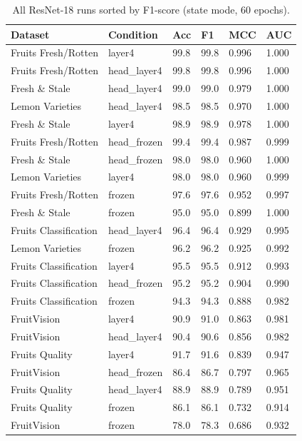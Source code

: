 \documentclass[12pt, a4paper]{article}
\begin{document}
\begin{table}[h]
\centering
\small
\caption{All ResNet-18 runs sorted by F1-score (state mode, 60 epochs).}
\label{tab:allruns}
\setlength{\tabcolsep}{4pt}
\begin{tabular}{L{3.5cm} C{2.2cm} C{1.2cm} C{1.2cm} C{1.2cm} C{1.2cm}}
\toprule
\textbf{Dataset} & \textbf{Condition} & \textbf{Acc} & \textbf{F1} & \textbf{MCC} & \textbf{AUC} \\
\midrule
Fruits Fresh/Rotten & layer4      & 99.8 & 99.8 & 0.996 & 1.000 \\
Fruits Fresh/Rotten & head\_layer4 & 99.8 & 99.8 & 0.996 & 1.000 \\
Fresh \& Stale      & head\_layer4 & 99.0 & 99.0 & 0.979 & 1.000 \\
Lemon Varieties     & head\_layer4 & 98.5 & 98.5 & 0.970 & 1.000 \\
Fresh \& Stale      & layer4      & 98.9 & 98.9 & 0.978 & 1.000 \\
Fruits Fresh/Rotten & head\_frozen & 99.4 & 99.4 & 0.987 & 0.999 \\
Fresh \& Stale      & head\_frozen & 98.0 & 98.0 & 0.960 & 1.000 \\
Lemon Varieties     & layer4      & 98.0 & 98.0 & 0.960 & 0.999 \\
Fruits Fresh/Rotten & frozen      & 97.6 & 97.6 & 0.952 & 0.997 \\
Fresh \& Stale      & frozen      & 95.0 & 95.0 & 0.899 & 1.000 \\
Fruits Classification & head\_layer4 & 96.4 & 96.4 & 0.929 & 0.995 \\
Lemon Varieties     & frozen      & 96.2 & 96.2 & 0.925 & 0.992 \\
Fruits Classification & layer4    & 95.5 & 95.5 & 0.912 & 0.993 \\
Fruits Classification & head\_frozen & 95.2 & 95.2 & 0.904 & 0.990 \\
Fruits Classification & frozen    & 94.3 & 94.3 & 0.888 & 0.982 \\
FruitVision         & layer4      & 90.9 & 91.0 & 0.863 & 0.981 \\
FruitVision         & head\_layer4 & 90.4 & 90.6 & 0.856 & 0.982 \\
Fruits Quality      & layer4      & 91.7 & 91.6 & 0.839 & 0.947 \\
FruitVision         & head\_frozen & 86.4 & 86.7 & 0.797 & 0.965 \\
Fruits Quality      & head\_layer4 & 88.9 & 88.9 & 0.789 & 0.951 \\
Fruits Quality      & frozen      & 86.1 & 86.1 & 0.732 & 0.914 \\
FruitVision         & frozen      & 78.0 & 78.3 & 0.686 & 0.932 \\
\bottomrule
\end{tabular}
\end{table}
\end{document}
